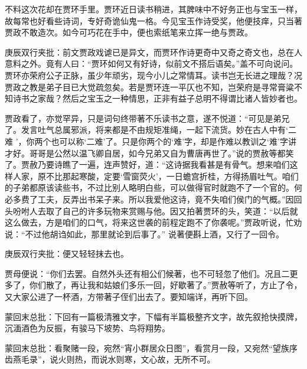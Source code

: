 \begin{parag}
    不料这次花却在贾环手里。贾环近日读书稍进，其脾味中不好务正也与宝玉一样，故每常也好看些诗词，专好奇诡仙鬼一格。今见宝玉作诗受奖，他便技痒，只当著贾政不敢造次。如今可巧花在手中，便也索纸笔来立挥一绝与贾政。\begin{note}庚辰双行夹批：前文贾政戏谑已是异文，而贾环作诗更奇中又奇之奇文也，总在人意料之外。竟有人曰：“贾环如何又有好诗，似前文不搭后语矣。”盖不可向说问。贾环亦荣府公子正脉，虽少年顽劣，现今小儿之常情耳。读书岂无长进之理哉？况贾政之教是弟子目已大觉疏忽矣。若是贾环连一平仄也不知，岂荣府是寻常膏粱不知诗书之家哉？然后之宝玉之一种情思，正非有益子总明不得谓比诸人皆妙者也。\end{note}贾政看了，亦觉罕异，只是词句终带著不乐读书之意，遂不悦道：“可见是弟兄了。发言吐气总属邪派，将来都是不由规矩准绳，一起下流货。妙在古人中有‘二难 ’，你两个也可以称‘二难’了。只是你两个的‘难’字，却是作难以教训之‘难’字讲才好。哥哥是公然以温飞卿自居，如今兄弟又自为曹唐再世了。”说的贾赦等都笑了。贾赦乃要诗瞧了一遍，连声赞好，道：“这诗据我看甚是有骨气。想来咱们这样人家，原不比那起寒酸，定要‘雪窗荧火’，一日蟾宫折桂，方得扬眉吐气。咱们的子弟都原该读些书，不过比别人略明白些，可以做得官时就跑不了一个官的。何必多费了工夫，反弄出书呆子来。所以我爱他这诗，竟不失咱们侯门的气概。”因回头吩咐人去取了自己的许多玩物来赏赐与他。因又拍著贾环的头，笑道：“以后就这么做去，方是咱们的口气，将来这世袭的前程定跑不了你袭呢。”贾政听说，忙劝说：“不过他胡诌如此，那里就论到后事了。” 说著便斟上酒，又行了一回令。\begin{note}庚辰双行夹批：便又轻轻抹去也。\end{note}贾母便说：“你们去罢。自然外头还有相公们候著，也不可轻忽了他们。况且二更多了，你们散了，再让我和姑娘们多乐一回，好歇著了。”贾赦等听了，方止了令，又大家公进了一杯酒，方带著子侄们出去了。要知端详，再听下回。
\end{parag}


\begin{parag}
    \begin{note}蒙回末总批：下回有一篇极清雅文字，下幅有半篇极整齐文字，故先叙抢快摸牌，沉湎酒色为反振，有骏马下坡势、鸟将翔势。\end{note}
\end{parag}


\begin{parag}
    \begin{note}蒙回末总批：看聚赌一段，宛然“宵小群居众日图”，看赏月一段，又宛然“望族序齿燕毛录”，说火则热，而说水则寒，文心故，无所不可。\end{note}
\end{parag}
